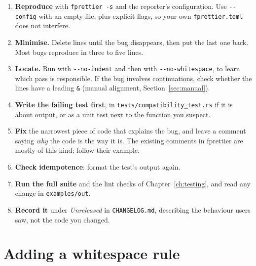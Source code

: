 \documentclass[11pt,a4paper,openany]{book}
\newcommand{\code}[1]{\texttt{\small #1}}
\newcommand{\file}[1]{\texttt{\small\color{accent}#1}}
\newcommand{\flag}[1]{\texttt{\small -{}-#1}}
\begin{document}
\begin{enumerate}
  \item \textbf{Reproduce} with \code{fprettier -s} and the reporter's
    configuration. Use \flag{config} with an empty file, plus explicit flags,
    so your own \file{fprettier.toml} does not interfere.
  \item \textbf{Minimise.} Delete lines until the bug disappears, then put the
    last one back. Most bugs reproduce in three to five lines.
  \item \textbf{Locate.} Run with \flag{no-indent} and then with
    \flag{no-whitespace}, to learn which pass is responsible. If the bug
    involves continuations, check whether the lines have a leading \code{\&}
    (manual alignment, Section~\ref{sec:manual}).
  \item \textbf{Write the failing test first}, in
    \file{tests/compatibility\_test.rs} if it is about output, or as a unit
    test next to the function you suspect.
  \item \textbf{Fix} the narrowest piece of code that explains the bug, and
    leave a comment saying \emph{why} the code is the way it is. The existing
    comments in fprettier are mostly of this kind; follow their example.
  \item \textbf{Check idempotence}: format the test's output again.
  \item \textbf{Run the full suite} and the lint checks of
    Chapter~\ref{ch:testing}, and read any change in \file{examples/out}.
  \item \textbf{Record it} under \emph{Unreleased} in \file{CHANGELOG.md},
    describing the behaviour users saw, not the code you changed.
\end{enumerate}

\section{Adding a whitespace rule}
\end{document}
